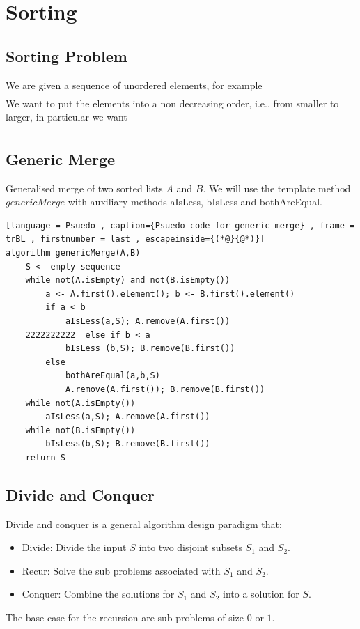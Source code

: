 \documentclass[a4paper]{article}
\theoremstyle{plain}
\theoremstyle{definition}
\theoremstyle{remark}
\begin{document}
\section{Sorting}
\subsection{Sorting Problem}
We are given a sequence of unordered elements, for example
\begin{align*}
	[3,6,2,7,8,10,22,9]
\end{align*}
We want to put the elements into a non decreasing order, i.e., from smaller to larger, in particular we want
\begin{align*}
	[2,3,6,7,8,9,10,22]
\end{align*}
\subsection{Generic Merge \label{gm}}
Generalised merge of two sorted lists $A$ and $B$. We will use the template method $genericMerge$ with auxiliary methods aIsLess, bIsLess and bothAreEqual.
 \begin{lstlisting}[language = Psuedo , caption={Psuedo code for generic merge} , frame = trBL , firstnumber = last , escapeinside={(*@}{@*)}]
algorithm genericMerge(A,B)
	S <- empty sequence
	while not(A.isEmpty) and not(B.isEmpty())
		a <- A.first().element(); b <- B.first().element()
		if a < b
			aIsLess(a,S); A.remove(A.first())
	2222222222	else if b < a
			bIsLess (b,S); B.remove(B.first())
		else 
			bothAreEqual(a,b,S)
			A.remove(A.first()); B.remove(B.first())
	while not(A.isEmpty())
		aIsLess(a,S); A.remove(A.first())
	while not(B.isEmpty())
		bIsLess(b,S); B.remove(B.first())
	return S
\end{lstlisting}
\subsection{Divide and Conquer}
Divide and conquer is a general algorithm design paradigm that:
\begin{itemize}
	\item Divide: Divide the input $S$ into two disjoint subsets $S_1$ and $S_2$.
	\item Recur: Solve the sub problems associated with $S_1$ and $S_2$.
	\item Conquer: Combine the solutions for $S_1$ and $S_2$ into a solution for $S$.
\end{itemize}
The base case for the recursion are sub problems of size $0$ or $1$.
\end{document}
